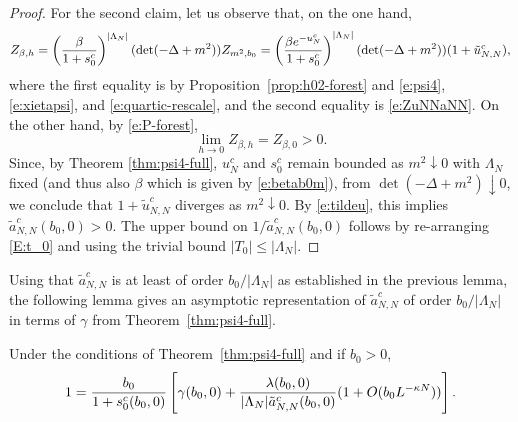 \documentclass[11pt]{amsart}
\numberwithin{equation}{section}
\numberwithin{theorem}{section}
\newcommand{\1}{{\bf 1}}
\newcommand{\cgamma}{\gamma}
\begin{document}
\begin{proof}
For the second claim,
let us observe that, on the one hand,
\begin{equation} \label{e:ZbetahuNN}
  Z_{\beta,h}
  = \left({\frac{\beta}{1+s_0^c}}\right)^{|\Lambda_N|} 
    (\det (-\Delta+m^2)) Z_{m^2, b_0}
  = \left({\frac{\beta e^{-u_{N}^{c}}}{1+s_0^c}}\right)^{|\Lambda_N|} 
    (\det (-\Delta+m^2))(1+\tilde u_{N,N}^{c}),
\end{equation}
where the first equality is by Proposition~\ref{prop:h02-forest} and \eqref{e:psi4}, \eqref{e:xietapsi}, and \eqref{e:quartic-rescale},
and the second equality is \eqref{e:ZuNNaNN}. 
On the other hand, by \eqref{e:P-forest},
\begin{equation}
\lim_{h\rightarrow 0} Z_{\beta,h}= Z_{\beta,0}>0.
\end{equation}
Since, by Theorem \ref{thm:psi4-full}, $u_{N}^{c}$ and $s_0^c$ remain bounded as
%
$m^2\downarrow 0$ with $\Lambda_N$ fixed (and thus also $\beta$ which is given by \eqref{e:betab0m}),
from $\det (-\Delta+m^2) \downarrow 0$,
we conclude that $1+\tilde u_{N,N}^c$ diverges as $m^2\downarrow 0$.
By \eqref{e:tildeu},
this implies $\tilde a_{N,N}^{c}(b_{0},0)>0$. The upper bound on
$1/\tilde a_{N,N}^c(b_0,0)$ follows by re-arranging \eqref{E:t_0} and
using the trivial bound $|T_0| \leq |\Lambda_N|$.
\end{proof}

Using that $\tilde a_{N,N}^c$ is at least of order $b_0/|\Lambda_N|$ as established in the previous lemma,
the following lemma gives an asymptotic representation of $\tilde a_{N,N}^c$ of order $b_0/|\Lambda_N|$
in terms of $\gamma$ from Theorem~\ref{thm:psi4-full}.

\begin{lemma}
  \label{cor:anm0}
  Under the conditions of
  Theorem~\ref{thm:psi4-full} and if $b_{0}>0$,
  \begin{equation}
    \label{e:anm0}
  1
  =
  \frac{b_0}{1+s_0^c(b_0,0)}
  \qa{
    \cgamma(b_0,0) + \frac{\lambda(b_0,0)}{|\Lambda_N|\tilde
      a_{N,N}^c(b_0,0)}
    (1+O(b_0L^{-\kappa N}))
  }
  .
\end{equation}
\end{lemma}
\end{document}
